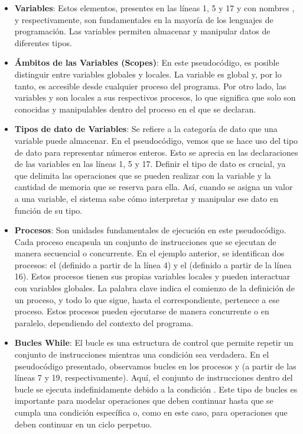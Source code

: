 \begin{itemize}
    \item \textbf{Variables}: Estos elementos, presentes en las líneas 1, 5 y 17 y con nombres ,  y  respectivamente, son fundamentales en la mayoría de los lenguajes de programación. Las variables permiten almacenar y manipular datos de diferentes tipos.
    
    \item \textbf{Ámbitos de las Variables (Scopes)}: En este pseudocódigo, es posible distinguir entre variables globales y locales. La variable  es global y, por lo tanto, es accesible desde cualquier proceso del programa. Por otro lado, las variables  y  son locales a sus respectivos procesos, lo que significa que solo son conocidas y manipulables dentro del proceso en el que se declaran.

    \item \textbf{Tipos de dato de Variables}: Se refiere a la categoría de dato que una variable puede almacenar. En el pseudocódigo, vemos que se hace uso del tipo de dato  para representar números enteros. Esto se aprecia en las declaraciones de las variables en las líneas 1, 5 y 17. Definir el tipo de dato es crucial, ya que delimita las operaciones que se pueden realizar con la variable y la cantidad de memoria que se reserva para ella. Así, cuando se asigna un valor a una variable, el sistema sabe cómo interpretar y manipular ese dato en función de su tipo.

    \item \textbf{Procesos}: Son unidades fundamentales de ejecución en este pseudocódigo. Cada proceso encapsula un conjunto de instrucciones que se ejecutan de manera secuencial o concurrente. En el ejemplo anterior, se identifican dos procesos: el  (definido a partir de la línea 4) y el  (definido a partir de la línea 16). Estos procesos tienen sus propias variables locales y pueden interactuar con variables globales. La palabra clave  indica el comienzo de la definición de un proceso, y todo lo que sigue, hasta el  correspondiente, pertenece a ese proceso. Estos procesos pueden ejecutarse de manera concurrente o en paralelo, dependiendo del contexto del programa.

    \item \textbf{Bucles While}: El bucle  es una estructura de control que permite repetir un conjunto de instrucciones mientras una condición sea verdadera. En el pseudocódigo presentado, observamos bucles  en los procesos  y  (a partir de las líneas 7 y 19, respectivamente). Aquí, el conjunto de instrucciones dentro del bucle se ejecuta indefinidamente debido a la condición . Este tipo de bucles es importante para modelar operaciones que deben continuar hasta que se cumpla una condición específica o, como en este caso, para operaciones que deben continuar en un ciclo perpetuo.


\end{itemize}
